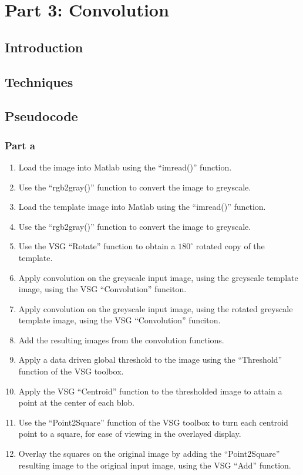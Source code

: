 \documentclass[a4paper]{article}
\begin{document}
	\section{Part 3: Convolution}
	\subsection{Introduction}
	\subsection{Techniques}
	\subsection{Pseudocode}
	\subsubsection{Part a}
	\begin{enumerate}
		\item Load the image into Matlab using the ``imread()''
			function.
		\item Use the ``rgb2gray()'' function to convert the image to
			greyscale.
		\item Load the template image into Matlab using the ``imread()''
			function.
		\item Use the ``rgb2gray()'' function to convert the image to
			greyscale.
		\item Use the VSG ``Rotate'' function to obtain a $180^\circ$ rotated
			copy of the template.
		\item Apply convolution on the greyscale input image, using the
			greyscale template image, using the VSG ``Convolution''
			funciton.
		\item Apply convolution on the greyscale input image, using the
			rotated greyscale template image, using the VSG
			``Convolution'' funciton.
		\item Add the resulting images from the convolution functions.
		\item Apply a data driven global threshold to the image using
			the ``Threshold'' function of the VSG toolbox.
		\item Apply the VSG ``Centroid'' function to the thresholded
			image to attain a point at the center of each blob.
		\item Use the ``Point2Square'' function of the VSG toolbox to
			turn each centroid point to a square, for ease of
			viewing in the overlayed display.
		\item Overlay the squares on the original image by adding the
			``Point2Square'' resulting image to the original input
			image, using the VSG ``Add'' function.
	\end{enumerate}
\end{document}
